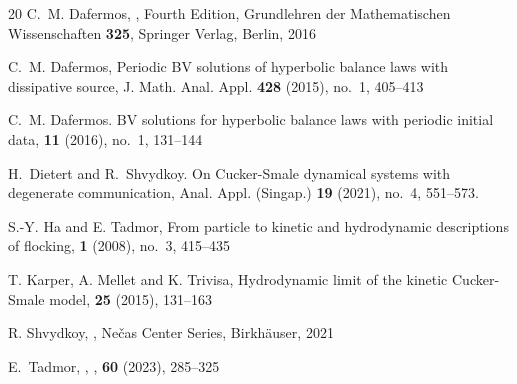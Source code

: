 \documentclass[10pt,reqno]{amsart}
\begin{document}
{\begin{thebibliography}{20}
 C.~M. Dafermos,
,
\newblock Fourth Edition, Grundlehren der Mathematischen Wissenschaften {\bf 325}, Springer Verlag, Berlin, 2016

 C.~M. Dafermos, 
\newblock Periodic BV solutions of hyperbolic balance laws with dissipative source, 
\newblock J. Math. Anal. Appl. {\bf 428} (2015), no.~1, 405--413 %

 C.~M. Dafermos.
\newblock BV solutions for hyperbolic balance laws with periodic initial data,
 {\bf 11} (2016), no.~1, 131--144

 H.~Dietert and R.~Shvydkoy. 
\newblock On Cucker-Smale dynamical systems with degenerate communication, 
\newblock Anal. Appl. (Singap.) {\bf 19} (2021), no.~4, 551--573. %

 S.-Y. Ha and E. Tadmor, 
\newblock From particle to kinetic and hydrodynamic descriptions of flocking,
 \textbf{1} (2008), no.~3, 415--435

 T. Karper, A. Mellet and K. Trivisa, 
\newblock Hydrodynamic limit of the kinetic Cucker-Smale model,
 \textbf{25} (2015), 131--163

 R. Shvydkoy, 
,
\newblock Ne\v{c}as Center Series, Birkh\"auser, 2021

 E.~Tadmor,
,
,  \textbf{60} (2023), 285--325

\end{thebibliography}
}
\end{document}
